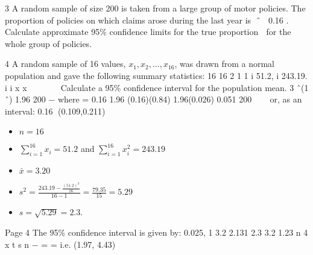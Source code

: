 \documentclass[a4paper,12pt]{article}
\begin{document}
\item 3 A random sample of size 200 is taken from a large group of motor policies. The
proportion of policies on which claims arose during the last year is ˆ  0.16 .
Calculate approximate 95\% confidence limits for the true proportion  for the whole
group of policies. 
\item 4 A random sample of 16 values, $x_1, x_2, \ldots , x_{16}$, was drawn from a normal population
and gave the following summary statistics:
16 16
2
1 1
i 51.2, i 243.19.
i i
x x
 
   
Calculate a 95\% confidence interval for the population mean. 
3 ˆ(1 ˆ) 1.96
200
\theta −\theta
\pm where \hat{\theta} = 0.16
1.96 (0.16)(0.84) 1.96(0.026) 0.051
200
⇒ \pm ⇒ \pm ⇒ \pm
or, as an interval: 0.16 ⇒(0.109,0.211)

\begin{itemize}

\item $n=16$

\item ${  \displaystyle  \sum^{16}_{i=1} x_i = 51.2 }$ and ${  \displaystyle  \sum^{16}_{i=1} x_i^2 = 243.19 }$

\item $\bar{x} =3.20 $

\item ${  \displaystyle s^2  = \frac{243.19 - \frac{(51.2)^2}{16}}{16-1}   = \frac{79.35}{15} = 5.29 }$

\item $ s = \sqrt{5.29} = 2.3$.

\end{itemize}
Page 4
The 95\% confidence interval is given by:
0.025, 1
3.2 2.131 2.3 3.2 1.23
n 4
x t s
n \pm − = \pm = \pm
i.e. (1.97, 4.43)
\end{document}
